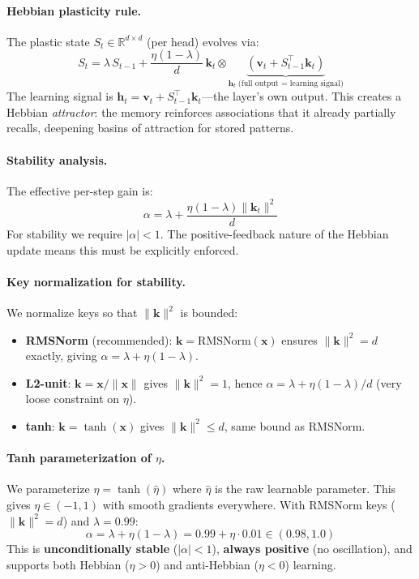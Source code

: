 \documentclass[11pt,a4paper]{article}
\begin{document}
\paragraph{Hebbian plasticity rule.}
The plastic state $S_t \in \mathbb{R}^{d \times d}$ (per head) evolves via:
\begin{equation}\label{eq:apan-update}
S_t = \lambda \, S_{t-1} + \frac{\eta(1-\lambda)}{d} \, \mathbf{k}_t \otimes \underbrace{(\mathbf{v}_t + S_{t-1}^\top \mathbf{k}_t)}_{\mathbf{h}_t\;\text{(full output = learning signal)}}
\end{equation}
The learning signal is $\mathbf{h}_t = \mathbf{v}_t + S_{t-1}^\top \mathbf{k}_t$---the layer's own output.
This creates a Hebbian \emph{attractor}: the memory reinforces associations that it already partially recalls, deepening basins of attraction for stored patterns.

\paragraph{Stability analysis.}
The effective per-step gain is:
\begin{equation}
\alpha = \lambda + \frac{\eta(1-\lambda)\|\mathbf{k}_t\|^2}{d}
\end{equation}
For stability we require $|\alpha| < 1$. The positive-feedback nature of the Hebbian update means this must be explicitly enforced.

\paragraph{Key normalization for stability.}
We normalize keys so that $\|\mathbf{k}\|^2$ is bounded:
\begin{itemize}
\item \textbf{RMSNorm} (recommended): $\mathbf{k} = \text{RMSNorm}(\mathbf{x})$ ensures $\|\mathbf{k}\|^2 = d$ exactly, giving $\alpha = \lambda + \eta(1-\lambda)$.
\item \textbf{L2-unit}: $\mathbf{k} = \mathbf{x}/\|\mathbf{x}\|$ gives $\|\mathbf{k}\|^2 = 1$, hence $\alpha = \lambda + \eta(1-\lambda)/d$ (very loose constraint on $\eta$).
\item \textbf{tanh}: $\mathbf{k} = \tanh(\mathbf{x})$ gives $\|\mathbf{k}\|^2 \le d$, same bound as RMSNorm.
\end{itemize}

\paragraph{Tanh parameterization of $\eta$.}
We parameterize $\eta = \tanh(\hat\eta)$ where $\hat\eta$ is the raw learnable parameter. This gives $\eta \in (-1, 1)$ with smooth gradients everywhere.
With RMSNorm keys ($\|\mathbf{k}\|^2 = d$) and $\lambda = 0.99$:
\begin{equation}
\alpha = \lambda + \eta(1-\lambda) = 0.99 + \eta \cdot 0.01 \in (0.98, 1.0)
\end{equation}
This is \textbf{unconditionally stable} ($|\alpha| < 1$), \textbf{always positive} (no oscillation), and supports both Hebbian ($\eta > 0$) and anti-Hebbian ($\eta < 0$) learning.
\end{document}
